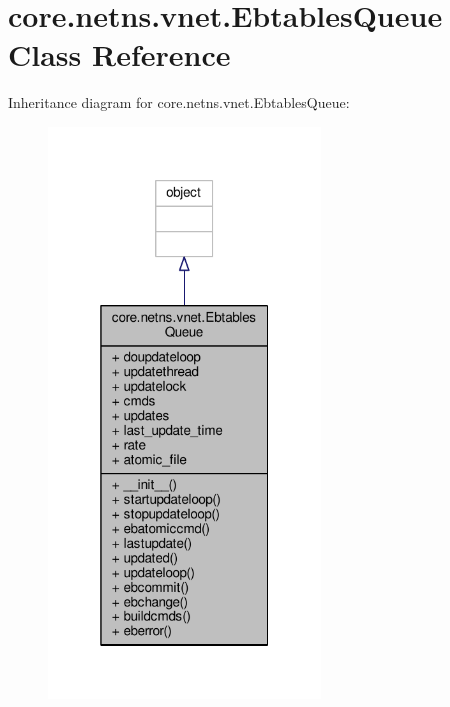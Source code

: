 \hypertarget{classcore_1_1netns_1_1vnet_1_1_ebtables_queue}{\section{core.\+netns.\+vnet.\+Ebtables\+Queue Class Reference}
\label{classcore_1_1netns_1_1vnet_1_1_ebtables_queue}
}


Inheritance diagram for core.\+netns.\+vnet.\+Ebtables\+Queue\+:
\nopagebreak
\begin{figure}[H]
\begin{center}
\leavevmode
\includegraphics[width=205pt]{classcore_1_1netns_1_1vnet_1_1_ebtables_queue__inherit__graph}
\end{center}
\end{figure}


